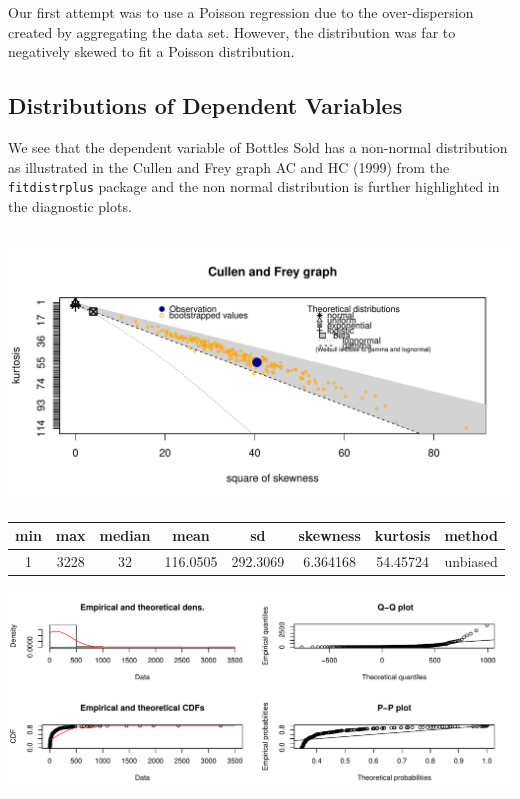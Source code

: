 \documentclass[]{elsarticle} %
\makeatletter
\def\maxwidth{\ifdim\Gin@nat@width>\linewidth\linewidth
\else\Gin@nat@width\fi}
\let\Oldincludegraphics\includegraphics
\renewcommand{\includegraphics}[1]{\Oldincludegraphics[width=\maxwidth]{#1}}
\makeatother
\begin{document}
Our first attempt was to use a Poisson regression due to the
over-dispersion created by aggregating the data set. However, the
distribution was far to negatively skewed to fit a Poisson distribution.

\subsection{Distributions of Dependent
Variables}\label{distributions-of-dependent-variables}

We see that the dependent variable of Bottles Sold has a non-normal
distribution as illustrated in the Cullen and Frey graph AC and HC
(1999) from the \texttt{fitdistrplus} package and the non normal
distribution is further highlighted in the diagnostic plots.

\subsection{\texorpdfstring{\protect\includegraphics{Final_Project_files/figure-latex/unnamed-chunk-10-1.pdf}}{}}\label{section}

\begin{longtable}[]{@{}cccccccc@{}}
\toprule
min & max & median & mean & sd & skewness & kurtosis &
method\tabularnewline
\midrule
\endhead
1 & 3228 & 32 & 116.0505 & 292.3069 & 6.364168 & 54.45724 &
unbiased\tabularnewline
\bottomrule
\end{longtable}

\includegraphics{Final_Project_files/figure-latex/unnamed-chunk-11-1.pdf}
\end{document}
